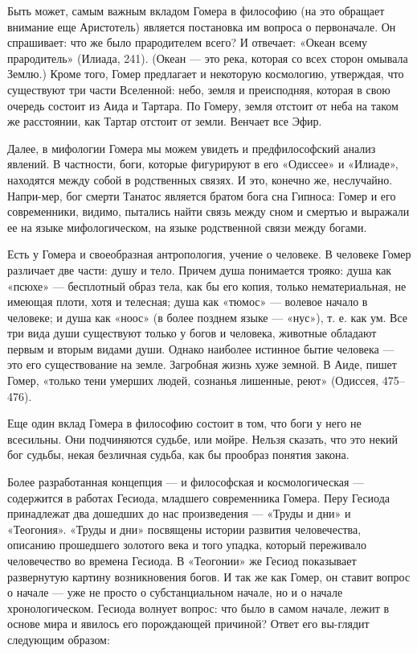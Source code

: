     \par Быть может, самым важным вкладом Гомера в философию (на это обращает внимание еще 
	Аристотель) является постановка им вопроса о первоначале. Он спрашивает: что же было 
	прародителем всего? И отвечает: «Океан всему прародитель» (Илиада, 241). (Океан — 
	это река, которая со всех сторон омывала Землю.) Кроме того, Гомер предлагает и 
	некоторую космологию, утверждая, что существуют три части Вселенной: небо, земля и 
	преисподняя, которая в свою очередь состоит из Аида и Тартара. По Гомеру, земля отстоит 
	от неба на таком же расстоянии, как Тартар отстоит от земли. Венчает все Эфир.
    
    \par Далее, в мифологии Гомера мы можем увидеть и предфилософский анализ явлений. 
	В частности, боги, которые фигурируют в его «Одиссее» и «Илиаде», находятся между 
	собой в родственных связях. И это, конечно же, неслучайно. Напри-мер, бог смерти 
	Танатос является братом бога сна Гипноса: Гомер и его современники, видимо, пытались 
	найти связь между сном и смертью и выражали ее на языке мифологическом, на языке 
	родственной связи между богами.
    
    \par Есть у Гомера и своеобразная антропология, учение о человеке. В человеке 
	Гомер различает две части: душу и тело. Причем душа понимается трояко: душа как 
	«псюхе» — бесплотный образ тела, как бы его копия, только нематериальная, не имеющая 
	плоти, хотя и телесная; душа как «тюмос» — волевое начало в человеке; и душа как «ноос» 
	(в более позднем языке — «нус»), т. е. как ум. Все три вида души существуют только 
	у богов и человека, животные обладают первым и вторым видами души. Однако наиболее
	истинное бытие человека — это его существование на земле. Загробная жизнь хуже земной. 
	В Аиде, пишет Гомер, «только тени умерших людей, сознанья лишенные, реют» (Одиссея, 
	475–476). 
    
    \par Еще один вклад Гомера в философию состоит в том, что боги у него не всесильны. 
	Они подчиняются судьбе, или мойре. Нельзя сказать, что это некий бог судьбы, некая 
	безличная судьба, как бы прообраз понятия закона.
    
    \par Более разработанная концепция — и философская и космологическая — содержится в 
	работах Гесиода, младшего современника Гомера. Перу Гесиода принадлежат два дошедших 
	до нас произведения — «Труды и дни» и «Теогония». «Труды и дни» посвящены истории 
	развития человечества, описанию прошедшего золотого века и того упадка, который 
	переживало человечество во времена Гесиода. В «Теогонии» же Гесиод показывает развернутую 
	картину возникновения богов. И так же как Гомер, он ставит вопрос о начале — уже не 
	просто о субстанциальном начале, но и о начале хронологическом. Гесиода волнует вопрос: 
	что было в самом начале, лежит в основе мира и явилось его порождающей причиной? 
	Ответ его вы-глядит следующим образом: 
    \\
    
